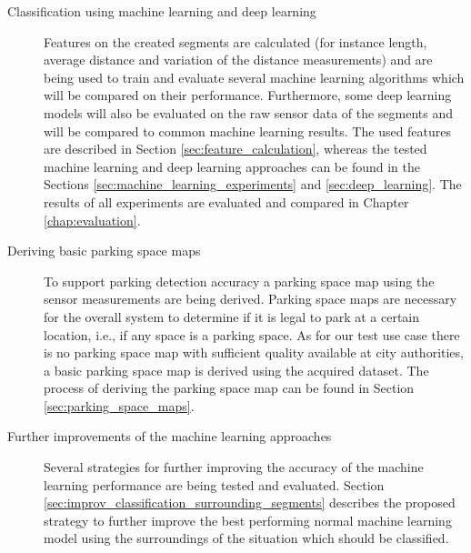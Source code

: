 \begin{description}
\item[Classification using machine learning and deep learning] Features on the created segments are calculated (for instance length, average distance and variation of the distance measurements) and are being used to train and evaluate several machine learning algorithms which will be compared on their performance. Furthermore, some deep learning models will also be evaluated on the raw sensor data of the segments and will be compared to common machine learning results. The used features are described in Section \ref{sec:feature_calculation}, whereas the tested machine learning and deep learning approaches can be found in the Sections \ref{sec:machine_learning_experiments} and \ref{sec:deep_learning}. The results of all experiments are evaluated and compared in Chapter \ref{chap:evaluation}.

\item[Deriving basic parking space maps] To support parking detection accuracy a parking space map using the sensor measurements are being derived. Parking space maps are necessary for the overall system to determine if it is legal to park at a certain location, i.e., if any space is a parking space. As for our test use case there is no parking space map with sufficient quality available at city authorities, a basic parking space map is derived using the acquired dataset. The process of deriving the parking space map can be found in Section \ref{sec:parking_space_maps}.

\item[Further improvements of the machine learning approaches] Several strategies for further improving the accuracy of the machine learning performance are being tested and evaluated. Section \ref{sec:improv_classification_surrounding_segments} describes the proposed strategy to further improve the best performing normal machine learning model using the surroundings of the situation which should be classified.


\end{description}


